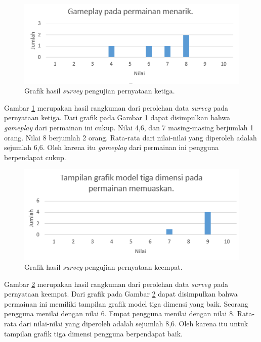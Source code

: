 \begin{figure}[htbp]
\centering
\includegraphics[scale=1]{Gambar/PengujianEksperimental/survey_ketiga.PNG}
\caption{Grafik hasil \textit{survey} pengujian pernyataan ketiga.} 
\label{fig:survey_pengujian_ketiga}
\end{figure}

Gambar \ref{fig:survey_pengujian_ketiga} merupakan hasil rangkuman dari perolehan data \textit{survey} pada pernyataan ketiga. Dari grafik pada Gambar \ref{fig:survey_pengujian_ketiga} dapat disimpulkan bahwa \textit{gameplay} dari permainan ini cukup. Nilai 4,6, dan 7 masing-masing berjumlah 1 orang. Nilai 8 berjumlah 2 orang. Rata-rata dari nilai-nilai yang diperoleh adalah sejumlah 6,6. Oleh karena itu \textit{gameplay} dari permainan ini pengguna berpendapat cukup.

\begin{figure}[htbp]
\centering
\includegraphics[scale=1]{Gambar/PengujianEksperimental/survey_keempat.PNG}
\caption{Grafik hasil \textit{survey} pengujian pernyataan keempat.} 
\label{fig:survey_pengujian_keempat}
\end{figure}

Gambar \ref{fig:survey_pengujian_keempat} merupakan hasil rangkuman dari perolehan data \textit{survey} pada pernyataan keempat. Dari grafik pada Gambar \ref{fig:survey_pengujian_keempat} dapat disimpulkan bahwa permainan ini memiliki tampilan grafik model tiga dimensi yang baik. Seorang pengguna menilai dengan nilai 6. Empat pengguna menilai dengan nilai 8. Rata-rata dari nilai-nilai yang diperoleh adalah sejumlah 8,6. Oleh karena itu untuk tampilan grafik tiga dimensi pengguna berpendapat baik.


